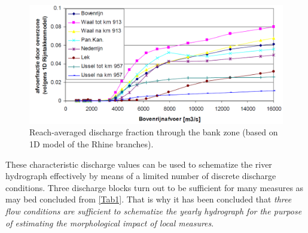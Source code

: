 \begin{figure}
\includegraphics[width=\columnwidth]{figures/Fig2b.png}
\caption{Reach-averaged discharge fraction through the bank zone (based on 1D model of the Rhine branches).}
\label{Fig2b}
\end{figure}

These characteristic discharge values can be used to schematize the river hydrograph effectively by means of a limited number of discrete discharge conditions.
Three discharge blocks turn out to be sufficient for many measures as may bed concluded from \autoref{Tab1}.
That is why it has been concluded that \emph{three flow conditions are sufficient to schematize the yearly hydrograph for the purpose of estimating the morphological impact of local measures}.

